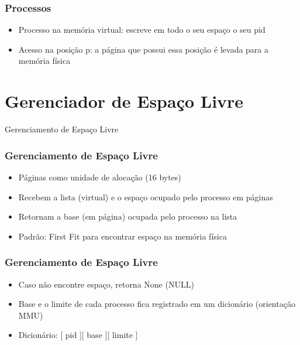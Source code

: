 \documentclass{beamer}
\begin{document}
\begin{frame}
\frametitle{Processos}

\begin{itemize}
\item Processo na memória virtual: escreve em todo o seu espaço o seu pid

\item Acesso na posição p: a página que possui essa posição é levada para a memória física
\end{itemize}
\justifying
\end{frame}


\section{Gerenciador de Espaço Livre} 
\begin{frame}
\begin{Large}
\begin{center}
Gerenciamento de Espaço Livre
\end{center}
\end{Large}
\end{frame}

\begin{frame}
\frametitle{Gerenciamento de Espaço Livre}
\begin{itemize}

\item Páginas como unidade de alocação (16 bytes)  

\item Recebem a lista (virtual) e o espaço ocupado pelo processo em páginas

\item Retornam a base (em página) ocupada pelo processo na lista

\item Padrão: First Fit para encontrar espaço na memória física

\end{itemize}
\end{frame}

\begin{frame}
\frametitle{Gerenciamento de Espaço Livre}
\begin{itemize}
\item Caso não encontre espaço, retorna None (NULL)

\item Base e o limite de cada processo fica registrado em um dicionário (orientação MMU) 

\item Dicionário: [ pid ][ base ][ limite ]
\end{itemize}
\end{frame}
\end{document}
